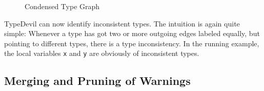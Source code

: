 \documentclass[runningheads,a4paper]{llncs}
\begin{document}
\begin{figure}[h]
    \caption{Condensed Type Graph}
    \label{fig:CondensedTG}
\end{figure}
TypeDevil can now identify inconsistent types. 
The intuition is again quite simple: 
Whenever a type has got two or more outgoing edges labeled equally, but pointing to different types, there is a type inconsistency.
In the running example, the local variables \lstinline[columns=fixed]{x} and \lstinline[columns=fixed]{y} are obviously of inconsistent types.


\newpage
\subsection{Merging and Pruning of Warnings}
\end{document}
